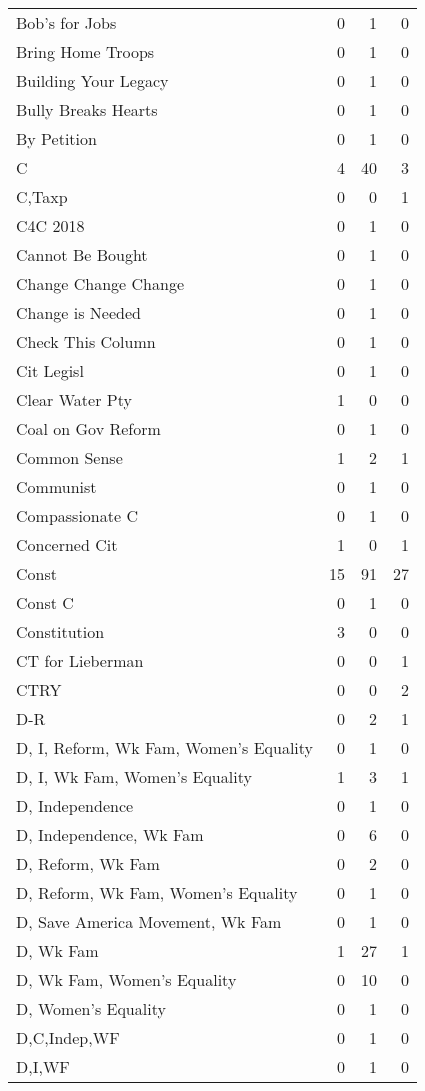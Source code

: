 \begin{supertabular}{lrrr}
Bob's for Jobs & 0 & 1 & 0\\
Bring Home Troops & 0 & 1 & 0\\
Building Your Legacy & 0 & 1 & 0\\
Bully Breaks Hearts & 0 & 1 & 0\\
By Petition & 0 & 1 & 0\\
C & 4 & 40 & 3\\
C,Taxp & 0 & 0 & 1\\
C4C 2018 & 0 & 1 & 0\\
Cannot Be Bought & 0 & 1 & 0\\
Change Change Change & 0 & 1 & 0\\
Change is Needed & 0 & 1 & 0\\
Check This Column & 0 & 1 & 0\\
Cit Legisl & 0 & 1 & 0\\
Clear Water Pty & 1 & 0 & 0\\
Coal on Gov Reform & 0 & 1 & 0\\
Common Sense & 1 & 2 & 1\\
Communist & 0 & 1 & 0\\
Compassionate C & 0 & 1 & 0\\
Concerned Cit & 1 & 0 & 1\\
Const & 15 & 91 & 27\\
Const C & 0 & 1 & 0\\
Constitution & 3 & 0 & 0\\
CT for Lieberman & 0 & 0 & 1\\
CTRY & 0 & 0 & 2\\
D-R & 0 & 2 & 1\\
D, I, Reform, Wk Fam, Women's Equality & 0 & 1 & 0\\
D, I, Wk Fam, Women's Equality & 1 & 3 & 1\\
D, Independence & 0 & 1 & 0\\
D, Independence, Wk Fam & 0 & 6 & 0\\
D, Reform, Wk Fam & 0 & 2 & 0\\
D, Reform, Wk Fam, Women's Equality & 0 & 1 & 0\\
D, Save America Movement, Wk Fam & 0 & 1 & 0\\
D, Wk Fam & 1 & 27 & 1\\
D, Wk Fam, Women's Equality & 0 & 10 & 0\\
D, Women's Equality & 0 & 1 & 0\\
D,C,Indep,WF & 0 & 1 & 0\\
D,I,WF & 0 & 1 & 0\\

\end{supertabular}

